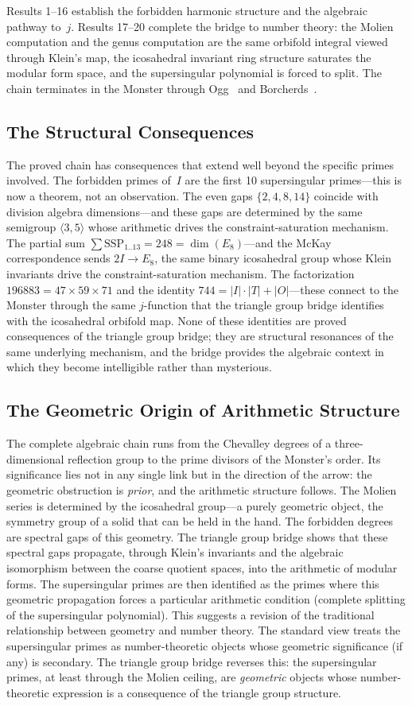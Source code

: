 \documentclass[11pt,letterpaper]{article}
\theoremstyle{definition}
\newcommand{\SSP}{\mathrm{SSP}}
\newcommand{\abs}[1]{\lvert #1 \rvert}
\newcommand{\gen}[1]{\langle #1 \rangle}
\begin{document}
Results 1--16 establish the forbidden harmonic structure and the algebraic pathway to~$j$.  Results 17--20 complete the bridge to number theory: the Molien computation and the genus computation are the same orbifold integral viewed through Klein's map, the icosahedral invariant ring structure saturates the modular form space, and the supersingular polynomial is forced to split.  The chain terminates in the Monster through Ogg~\cite{Ogg1975} and Borcherds~\cite{Borcherds1992}.
\subsection{The Structural Consequences}
The proved chain has consequences that extend well beyond the specific primes involved.
The forbidden primes of~$I$ are the first 10 supersingular primes---this is now a theorem, not an observation.  The even gaps $\{2,4,8,14\}$ coincide with division algebra dimensions---and these gaps are determined by the same semigroup $\gen{3,5}$ whose arithmetic drives the constraint-saturation mechanism.  The partial sum $\sum\SSP_{1..13}=248=\dim(E_8)$---and the McKay correspondence sends $2I\to E_8$, the same binary icosahedral group whose Klein invariants drive the constraint-saturation mechanism.  The factorization $196883=47\times59\times71$ and the identity $744=\abs{I}\cdot\abs{T}+\abs{O}$---these connect to the Monster through the same $j$-function that the triangle group bridge identifies with the icosahedral orbifold map.
None of these identities are proved consequences of the triangle group bridge; they are structural resonances of the same underlying mechanism, and the bridge provides the algebraic context in which they become intelligible rather than mysterious.
\subsection{The Geometric Origin of Arithmetic Structure}
The complete algebraic chain runs from the Chevalley degrees of a three-dimensional reflection group to the prime divisors of the Monster's order.  Its significance lies not in any single link but in the direction of the arrow: the geometric obstruction is \emph{prior}, and the arithmetic structure follows.
The Molien series is determined by the icosahedral group---a purely geometric object, the symmetry group of a solid that can be held in the hand.  The forbidden degrees are spectral gaps of this geometry.  The triangle group bridge shows that these spectral gaps propagate, through Klein's invariants and the algebraic isomorphism between the coarse quotient spaces, into the arithmetic of modular forms.  The supersingular primes are then identified as the primes where this geometric propagation forces a particular arithmetic condition (complete splitting of the supersingular polynomial).
This suggests a revision of the traditional relationship between geometry and number theory.  The standard view treats the supersingular primes as number-theoretic objects whose geometric significance (if any) is secondary.  The triangle group bridge reverses this: the supersingular primes, at least through the Molien ceiling, are \emph{geometric} objects whose number-theoretic expression is a consequence of the triangle group structure.
\end{document}
